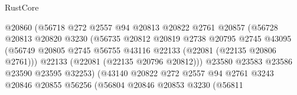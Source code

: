 \begin{lexlean}{RustCore}
\begin{coremodule}
                                        @20860
                                        (@56718
                                          @272
                                          @2557
                                          @94
                                          @20813
                                          @20822
                                          @2761
                                          @20857
                                          (@56728
                                            @20813
                                            @20820
                                            @3230
                                            (@56735
                                              @20812
                                              @20819
                                              @2738
                                              @20795
                                              @2745
                                              @43095
                                              (@56749
                                                @20805
                                                @2745
                                                @56755
                                                @43116
                                                @22133
                                                (@22081 (@22135 @20806 @2761)))
                                              @22133
                                              (@22081 (@22135 @20796 @20812)))
                                            @23580
                                            @23583
                                            @23586
                                            @23590
                                            @23595
                                            @32253)
                                          (@43140
                                            @20822
                                            @272
                                            @2557
                                            @94
                                            @2761
                                            @3243
                                            @20846
                                            @20855
                                            @56256
                                            (@56804
                                              @20846
                                              @20853
                                              @3230
                                              (@56811

\end{coremodule}
\end{lexlean}
